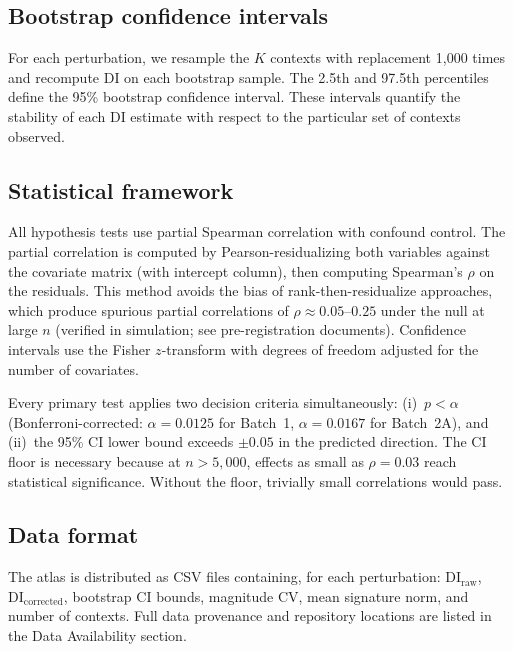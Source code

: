 \documentclass[11pt]{article}
\begin{document}
\subsection{Bootstrap confidence intervals}

For each perturbation, we resample the $K$ contexts with replacement
1{,}000 times and recompute DI on each bootstrap sample.  The 2.5th and
97.5th percentiles define the 95\% bootstrap confidence interval.  These
intervals quantify the stability of each DI estimate with respect to the
particular set of contexts observed.

\subsection{Statistical framework}

All hypothesis tests use partial Spearman correlation with confound
control.  The partial correlation is computed by Pearson-residualizing
both variables against the covariate matrix (with intercept column),
then computing Spearman's $\rho$ on the residuals.  This method avoids
the bias of rank-then-residualize approaches, which produce spurious
partial correlations of $\rho \approx 0.05$--$0.25$ under the null at
large $n$ (verified in simulation; see pre-registration documents).
Confidence intervals use the Fisher $z$-transform with degrees of
freedom adjusted for the number of covariates.

Every primary test applies two decision criteria simultaneously:
(i)~$p < \alpha$ (Bonferroni-corrected: $\alpha = 0.0125$ for Batch~1,
$\alpha = 0.0167$ for Batch~2A), and (ii)~the 95\% CI lower bound
exceeds $\pm 0.05$ in the predicted direction.  The CI floor is
necessary because at $n > 5{,}000$, effects as small as
$\rho = 0.03$ reach statistical significance.  Without the floor,
trivially small correlations would pass.

\subsection{Data format}

The atlas is distributed as CSV files containing, for each perturbation:
$\mathrm{DI}_{\mathrm{raw}}$, $\mathrm{DI}_{\mathrm{corrected}}$,
bootstrap CI bounds, magnitude CV, mean signature norm, and number of
contexts.  Full data provenance and repository locations are listed in
the Data Availability section.


\end{document}
